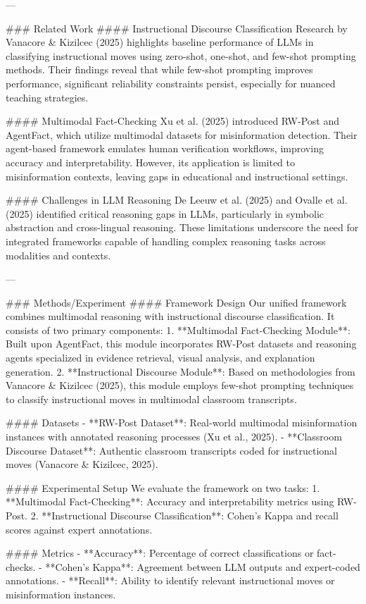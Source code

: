---

### Related Work
#### Instructional Discourse Classification
Research by Vanacore & Kizilcec (2025) highlights baseline performance of LLMs in classifying instructional moves using zero-shot, one-shot, and few-shot prompting methods. Their findings reveal that while few-shot prompting improves performance, significant reliability constraints persist, especially for nuanced teaching strategies.

#### Multimodal Fact-Checking
Xu et al. (2025) introduced RW-Post and AgentFact, which utilize multimodal datasets for misinformation detection. Their agent-based framework emulates human verification workflows, improving accuracy and interpretability. However, its application is limited to misinformation contexts, leaving gaps in educational and instructional settings.

#### Challenges in LLM Reasoning
De Leeuw et al. (2025) and Ovalle et al. (2025) identified critical reasoning gaps in LLMs, particularly in symbolic abstraction and cross-lingual reasoning. These limitations underscore the need for integrated frameworks capable of handling complex reasoning tasks across modalities and contexts.

---

### Methods/Experiment
#### Framework Design
Our unified framework combines multimodal reasoning with instructional discourse classification. It consists of two primary components:
1. **Multimodal Fact-Checking Module**: Built upon AgentFact, this module incorporates RW-Post datasets and reasoning agents specialized in evidence retrieval, visual analysis, and explanation generation.
2. **Instructional Discourse Module**: Based on methodologies from Vanacore & Kizilcec (2025), this module employs few-shot prompting techniques to classify instructional moves in multimodal classroom transcripts.

#### Datasets
- **RW-Post Dataset**: Real-world multimodal misinformation instances with annotated reasoning processes (Xu et al., 2025).
- **Classroom Discourse Dataset**: Authentic classroom transcripts coded for instructional moves (Vanacore & Kizilcec, 2025).

#### Experimental Setup
We evaluate the framework on two tasks:
1. **Multimodal Fact-Checking**: Accuracy and interpretability metrics using RW-Post.
2. **Instructional Discourse Classification**: Cohen's Kappa and recall scores against expert annotations.

#### Metrics
- **Accuracy**: Percentage of correct classifications or fact-checks.
- **Cohen's Kappa**: Agreement between LLM outputs and expert-coded annotations.
- **Recall**: Ability to identify relevant instructional moves or misinformation instances.

